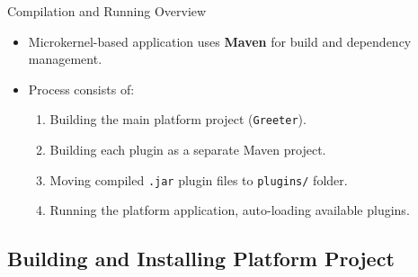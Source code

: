 \documentclass[aspectratio=169, table]{beamer}
\begin{document}
\begin{frame}[fragile]{Compilation and Running Overview}
	\vspace{20pt}
	\begin{itemize}
		\item Microkernel-based application uses \textbf{Maven} for build and dependency management.
		\item Process consists of:
		\begin{enumerate}
			\item Building the main platform project (\texttt{Greeter}).
			\item Building each plugin as a separate Maven project.
			\item Moving compiled \texttt{.jar} plugin files to \texttt{plugins/} folder.
			\item Running the platform application, auto-loading available plugins.
		\end{enumerate}
	\end{itemize}
\end{frame}

\subsection{Building and Installing Platform Project}
\end{document}
